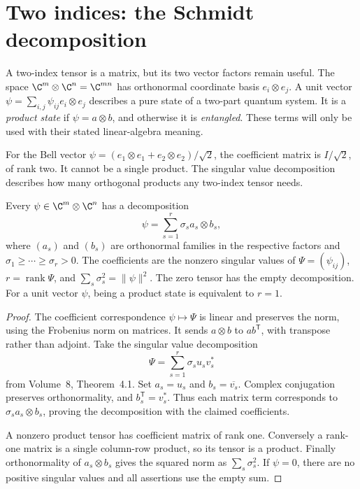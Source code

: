 \section{Two indices: the Schmidt decomposition}

A two-index tensor is a matrix, but its two vector factors remain useful. The space $\C^m\otimes\C^n=\C^{mn}$ has orthonormal coordinate basis $e_i\otimes e_j$. A unit vector
$\psi=\sum_{i,j}\psi_{ij}e_i\otimes e_j$ describes a pure state of a two-part quantum system. It is a \emph{product state} if $\psi=a\otimes b$, and otherwise it is \emph{entangled}. These terms will only be used with their stated linear-algebra meaning.

For the Bell vector $\psi=(e_1\otimes e_1+e_2\otimes e_2)/\sqrt2$, the coefficient matrix is $I/\sqrt2$, of rank two. It cannot be a single product. The singular value decomposition describes how many orthogonal products any two-index tensor needs.

\begin{theorem}\label{linear:thm:schmidt}
Every $\psi\in\C^m\otimes\C^n$ has a decomposition
\[
\psi=\sum_{s=1}^r\sigma_s a_s\otimes b_s,
\]
where $(a_s)$ and $(b_s)$ are orthonormal families in the respective factors and $\sigma_1\ge\cdots\ge\sigma_r>0$. The coefficients are the nonzero singular values of $\Psi=(\psi_{ij})$, $r=\operatorname{rank}\Psi$, and
$\sum_s\sigma_s^2=\|\psi\|^2$. The zero tensor has the empty decomposition. For a unit vector $\psi$, being a product state is equivalent to $r=1$.
\end{theorem}
\begin{proof}
The coefficient correspondence $\psi\mapsto\Psi$ is linear and preserves the norm, using the Frobenius norm on matrices. It sends $a\otimes b$ to $ab^{\mathsf T}$, with transpose rather than adjoint. Take the singular value decomposition
\[
\Psi=\sum_{s=1}^r\sigma_su_sv_s^*
\]
from Volume~8, Theorem~4.1. Set $a_s=u_s$ and $b_s=\overline{v_s}$. Complex conjugation preserves orthonormality, and $b_s^{\mathsf T}=v_s^*$. Thus each matrix term corresponds to $\sigma_sa_s\otimes b_s$, proving the decomposition with the claimed coefficients.

A nonzero product tensor has coefficient matrix of rank one. Conversely a rank-one matrix is a single column-row product, so its tensor is a product. Finally orthonormality of $a_s\otimes b_s$ gives the squared norm as $\sum_s\sigma_s^2$. If $\psi=0$, there are no positive singular values and all assertions use the empty sum.
\end{proof}

